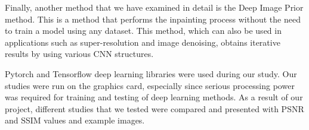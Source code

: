 Finally, another method that we have examined in detail is the Deep Image Prior method. This is a method that performs the inpainting process without the need to train a model using any dataset. This method, which can also be used in applications such as super-resolution and image denoising, obtains iterative results by using various CNN structures.

Pytorch and Tensorflow deep learning libraries were used during our study. Our studies were run on the graphics card, especially since serious processing power was required for training and testing of deep learning methods. As a result of our project, different studies that we tested were compared and presented with PSNR and SSIM values and example images.